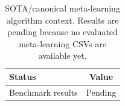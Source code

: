\begin{table}[t]
\centering
\small
\begin{tabular}{lc}
\toprule
Status & Value \\
\midrule
Benchmark results & Pending \\
\bottomrule
\end{tabular}
\caption{SOTA/canonical meta-learning algorithm context. Results are pending because no evaluated meta-learning CSVs are available yet.}
\label{tab:stage2_meta_algorithm_summary}
\end{table}
